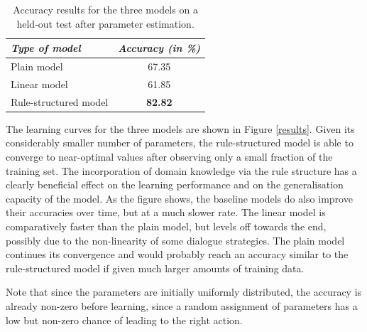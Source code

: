 \begin{table}[h]
\begin{center}
\begin{tabular}{|l|c|} \hline
\textit{Type of model} & \textit{Accuracy (in \%) } \\ \hline \hline
Plain model & 67.35 \\ \hline
Linear model & 61.85 \\ \hline
Rule-structured model & \textbf{82.82} \\ \hline
\end{tabular}
\end{center}
\vspace{-2mm}
\caption{Accuracy results for the three models on a held-out test after parameter estimation.}
\vspace{-2mm}
\label{table}
\end{table}

The learning curves for the three models are shown in Figure \ref{results}.   Given its considerably smaller number of parameters, the rule-structured model is able to converge to near-optimal values after observing only a small fraction of the training set.  The incorporation of domain knowledge via the rule structure has a clearly beneficial effect on the learning performance and on the generalisation capacity of the model.  As the figure shows, the baseline models do also improve their accuracies over time, but at a much slower rate.   The linear model is comparatively faster than the plain model, but levels off towards the end, possibly due to the non-linearity of some dialogue strategies.  The plain model continues its convergence and would probably reach an accuracy similar to the rule-structured model if given much larger amounts of training data. 

Note that since the parameters are initially uniformly distributed, the accuracy is already non-zero before learning, since a random assignment of parameters has a low but non-zero chance of leading to the right action.


